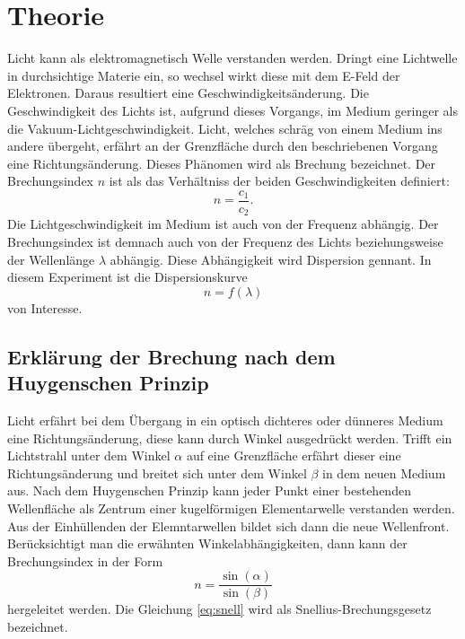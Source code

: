 \section{Theorie}
\label{sec:Theorie}
Licht kann als elektromagnetisch Welle verstanden werden.
Dringt eine Lichtwelle in durchsichtige Materie ein, so wechsel wirkt diese mit dem E-Feld der Elektronen.
Daraus resultiert eine Geschwindigkeitsänderung.
Die Geschwindigkeit des Lichts ist, aufgrund dieses Vorgangs, im Medium geringer als die Vakuum-Lichtgeschwindigkeit.
Licht, welches schräg von einem Medium ins andere übergeht, erfährt an der Grenzfläche durch den beschriebenen Vorgang eine Richtungsänderung.
Dieses Phänomen wird als Brechung bezeichnet.
Der Brechungsindex $n$ ist als das Verhältniss der beiden Geschwindigkeiten definiert:
\begin{equation}
  n= \frac{c_1}{c_2} .
\end{equation}
Die Lichtgeschwindigkeit im Medium ist auch von der Frequenz abhängig.
Der Brechungsindex ist demnach auch von der Frequenz des Lichts beziehungsweise der Wellenlänge $\lambda$ abhängig.
Diese Abhängigkeit wird Dispersion gennant.
In diesem Experiment ist die Dispersionskurve
\begin{equation}
  n= f(\lambda)
\end{equation}
von Interesse.
\subsection{Erklärung der Brechung nach dem Huygenschen Prinzip}
Licht erfährt bei dem Übergang in ein optisch dichteres oder dünneres Medium eine Richtungsänderung, diese kann durch Winkel ausgedrückt werden.
Trifft ein Lichtstrahl unter dem Winkel $\alpha$ auf eine Grenzfläche erfährt dieser eine Richtungsänderung und breitet sich unter dem Winkel $\beta$ in dem neuen Medium aus.
Nach dem Huygenschen Prinzip kann jeder Punkt einer bestehenden Wellenfläche als Zentrum einer kugelförmigen Elementarwelle verstanden werden.
Aus der Einhüllenden der Elemntarwellen bildet sich dann die neue Wellenfront.
Berücksichtigt man die erwähnten Winkelabhängigkeiten, dann kann der Brechungsindex in der Form
\begin{equation}
  \label{eq:snell}
  n = \frac{\sin(\alpha)}{\sin(\beta)}
\end{equation}
hergeleitet werden.
Die Gleichung \eqref{eq:snell} wird als Snellius-Brechungsgesetz bezeichnet.
